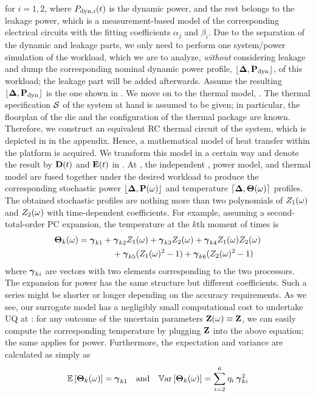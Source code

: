 for $i = 1, 2$, where $P_{\text{dyn}, i}(t)$ is the dynamic power, and the rest belongs to the leakage power, which is a measurement-based model of the corresponding electrical circuits with the fitting coefficients $\alpha_j$ and $\beta_i$. Due to the separation of the dynamic and leakage parts, we only need to perform one system/power simulation of the workload, which we are to analyze, \emph{without} considering leakage and dump the corresponding nominal dynamic power profile, $\profPdyn$, of this workload; the leakage part will be added afterwards. Assume the resulting $\profPdyn$ is the one shown in . We move on to the thermal model, . The thermal specification $\mathcal{S}$ of the system at hand is assumed to be given; in particular, the floorplan of the die and the configuration of the thermal package are known. Therefore, we construct an equivalent RC thermal circuit of the system, which is depicted in  in the appendix. Hence, a mathematical model of heat transfer within the platform is acquired. We transform this model in a certain way and denote the result by $\mCF(\t)$ and $\mCS(\t)$ in . At , the independent \rvs, power model, and thermal model are fused together under the desired workload to produce the corresponding stochastic power $\profP{\o}$ and temperature $\profT{\o}$ profiles. The obtained stochastic profiles are nothing more than two polynomials of $Z_1(\omega)$ and $Z_2(\omega)$ with time-dependent coefficients. For example, assuming a second-total-order PC expansion, the temperature at the $k$th moment of times is
\begin{align*}
  {\boldsymbol\Theta}_k(\omega) &= {\boldsymbol\gamma}_{k1} + {\boldsymbol\gamma}_{k2} Z_1(\omega) + {\boldsymbol\gamma}_{k3} Z_2(\omega) + {\boldsymbol\gamma}_{k4} Z_1(\omega) Z_2(\omega) \\
  & \qquad \qquad {} + {\boldsymbol\gamma}_{k5} (Z_1(\omega)^2 - 1) + {\boldsymbol\gamma}_{k6} (Z_2(\omega)^2 - 1)
\end{align*}
where ${\boldsymbol\gamma}_{ki}$ are vectors with two elements corresponding to the two processors. The expansion for power has the same structure but different coefficients. Such a series might be shorter or longer depending on the accuracy requirements. As we see, our surrogate model has a negligibly small computational cost to undertake UQ at : for any outcome of the uncertain parameters $\mathbf{Z}(\omega) \equiv \mathbf{Z}$, we can easily compute the corresponding temperature by plugging $\mathbf{Z}$ into the above equation; the same applies for power. Furthermore, the expectation and variance are calculated as simply as
\[
  \mathbb{E}\left[{\boldsymbol\Theta}_k(\omega)\right] = {\boldsymbol\gamma}_{k1} \hspace{1em} \text{and} \hspace{1em} \mathbb{V}\text{ar}\left[{\boldsymbol\Theta}_k(\omega)\right] = \sum_{i = 2}^{6} \eta_i \: {\boldsymbol\gamma}_{ki}^2
\]
